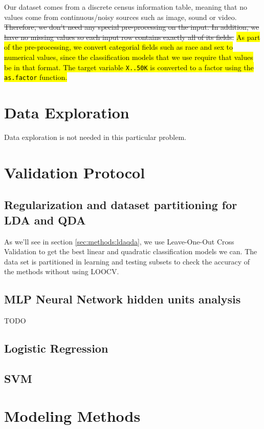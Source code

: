 \documentclass[english]{scrartcl}
\newcommand\ms[1]{\texttt{#1}}
\newcommand\R[1]{\texttt{#1}}
\begin{document}
Our dataset comes from a discrete census information table, meaning that no values come from continuous/noisy sources such as image, sound or video. \st{Therefore, we don't need any special pre-processing on the input. In addition, 
we have no missing values so each input row contains exactly all of its fields.} \hl{As part of the pre-processing, we convert categorial fields such as race and sex to numerical values, since the classification models that we use require that values be in that format. The target variable \ms{X..50K} is converted to a factor using the \R{as.factor} function.}

\section{Data Exploration}

Data exploration is not needed in this particular problem.

\section{Validation Protocol}

    \subsection{Regularization and dataset partitioning for LDA and QDA}
    As we'll see in section \ref{sec:methods:ldaqda}, we use Leave-One-Out Cross Validation to get the best linear and quadratic classification models we 
    can. The data set is partitioned in learning and testing subsets to check the accuracy of the methods without using LOOCV.
    
    \subsection{MLP Neural Network hidden units analysis}
    TODO
    
    \subsection{Logistic Regression}    
    
    \subsection{SVM}

\section{Modeling Methods}
\end{document}
